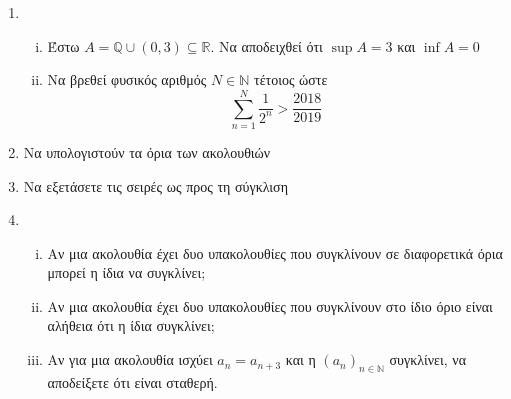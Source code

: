 \documentclass[a4paper,table]{report}
\begin{document}
\begin{enumerate}
    \item 
    \begin{enumerate}[i)]
        \item Έστω $ A = \mathbb{Q} \cup (0,3) \subseteq \mathbb{R} $. Να 
            αποδειχθεί ότι $ \sup A = 3 $ και $ \inf A = 0 $
        \item Να βρεθεί φυσικός αριθμός $N \in \mathbb{N} $ τέτοιος ώστε 
            \[
                \sum_{n=1}^{N} \frac{1}{2^{n}} > \frac{2018}{2019} 
            \] 
    \end{enumerate}
   
 
\item Να υπολογιστούν τα όρια των ακολουθιών 
    \begin{enumerate}[i)]
    \end{enumerate}
    
    \item Να εξετάσετε τις σειρές ως προς τη σύγκλιση    

    \item
        \begin{enumerate}[i)]
            \item Αν μια ακολουθία έχει δυο υπακολουθίες που συγκλίνουν σε διαφορετικά 
                όρια μπορεί η ίδια να συγκλίνει;
            \item Αν μια ακολουθία έχει δυο υπακολουθίες που συγκλίνουν 
                στο ίδιο όριο είναι αλήθεια ότι η ίδια συγκλίνει;
            \item Αν για μια ακολουθία ισχύει $ a_{n} = a_{n+3} $ και η 
                $ {(a_{n})}_{n \in \mathbb{N}} $ συγκλίνει, να αποδείξετε ότι 
                είναι σταθερή.
        \end{enumerate}


\end{enumerate}
\end{document}

